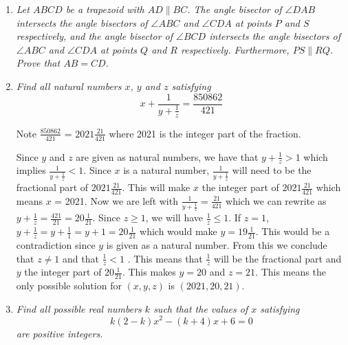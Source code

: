 \documentclass{article}
\begin{document}
\begin{enumerate}[1.]
\item %
{\itshape Let $ABCD$ be a trapezoid with $AD \parallel BC$. The angle bisector of $\angle DAB$ intersects the angle bisectors of $\angle ABC$ and $\angle CDA$ at points $P$ and $S$ respectively, and the angle bisector of $\angle BCD$ intersects the angle bisectors of $\angle ABC$ and $\angle CDA$ at points $Q$ and $R$ respectively. Furthermore, $PS \parallel RQ$. Prove that $AB = CD$. }

\item %
{\itshape Find all natural numbers $x$, $y$ and $z$ satisfying 
$$x + \frac{1}{y + \frac{1}{z}} = \frac{850862}{421}$$}

Note $\frac{850862}{421}$ = $2021\frac{21}{421}$ where 2021 is the integer part of the fraction.

Since $y$ and $z$ are given as natural numbers, we have that $y + \frac{1}{z} > 1$ which implies $\frac{1}{y + \frac{1}{z}} < 1$. Since $x$ is a natural number,  $\frac{1}{y + \frac{1}{z}}$ will need to be the fractional part of  $2021\frac{21}{421}$. This will make $x$ the integer part of $2021\frac{21}{421}$ which means $x$ = 2021. Now we are left with $\frac{1}{y + \frac{1}{z}} = \frac{21}{421}$ which we can rewrite as $y + \frac{1}{z} = \frac{421}{21} = 20\frac{1}{21}$. Since $z\geq1$, we will have $\frac{1}{z}\leq1$. If $z = 1$, $y + \frac{1}{z} = y + \frac{1}{1} = y + 1 = 20\frac{1}{21}$ which would make $y = 19\frac{1}{21}$. This would be a contradiction since $y$ is given as a natural number. From this we conclude that $z\neq 1$ and that $\frac{1}{z}<1$ . This means that $\frac{1}{z}$ will be the fractional part and $y$ the integer part of $20\frac{1}{21}$. This makes $y = 20$ and $z = 21$. 
This means the only possible solution for $(x, y, z)$ is $(2021, 20, 21)$. 

\item %
{\itshape Find all possible real numbers $k$ such that the values of $x$ satisfying
$$k(2 - k)x^2 - (k + 4)x + 6 = 0$$
are positive integers.}


\end{enumerate}
\end{document}
